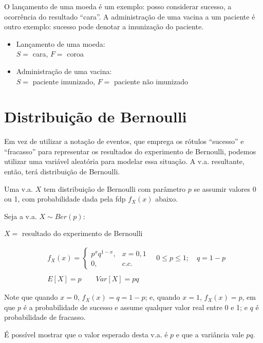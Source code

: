 \documentclass[
]{book}
\theoremstyle{definition}
\theoremstyle{definition}
\theoremstyle{definition}
\theoremstyle{remark}
\begin{document}
O lançamento de uma moeda é um exemplo: posso considerar sucesso, a ocorrência do resultado ``cara''. A administração de uma vacina a um paciente é outro exemplo: sucesso pode denotar a imunização do paciente.

\begin{itemize}
\item
  Lançamento de uma moeda:\\
  \(S =\) cara, \(F =\) coroa
\item
  Administração de uma vacina:\\
  \(S =\) paciente imunizado, \(F =\) paciente não imunizado
\end{itemize}

\hypertarget{distribuiuxe7uxe3o-de-bernoulli}{%
\section{Distribuição de Bernoulli}\label{distribuiuxe7uxe3o-de-bernoulli}}

Em vez de utilizar a notação de eventos, que emprega os rótulos ``sucesso'' e ``fracasso'' para representar os resultados do experimento de Bernoulli, podemos utilizar uma variável aleatória para modelar essa situação. A v.a. resultante, então, terá distribuição de Bernoulli.

Uma v.a. \(X\) tem distribuição de Bernoulli com parâmetro \(p\) se assumir valores 0 ou 1, com probabilidade dada pela fdp \(f_X(x)\) abaixo.

Seja a v.a. \(X \sim Ber(p)\):

\(X =\) resultado do experimento de Bernoulli

\begin{align*}
  &{} f_{X}(x) = \left\{
  \begin{array}{rl}
    p^x q^{1-x}, & x=0, 1\\
    0,           & c.c.
  \end{array}\right.
  \quad 0 \leq p \leq 1; \quad q=1-p\\ 
  \\
  &{} E[X] = p \qquad Var[X] = pq
\end{align*}

Note que quando \(x=0\), \(f_X(x) = q = 1-p\); e, quando \(x=1\), \(f_X(x)= p\), em que \(p\) é a probabilidade de sucesso e assume qualquer valor real entre 0 e 1; e \(q\) é probabilidade de fracasso.

É possível mostrar que o valor esperado desta v.a. é \(p\) e que a variância vale \(pq\).
\end{document}
